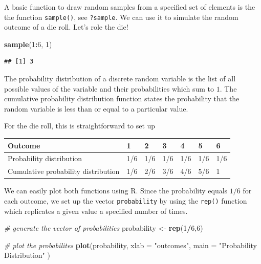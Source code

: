 \documentclass[]{book}
\newenvironment{Shaded}{\begin{snugshade}}{\end{snugshade}}
\newcommand{\KeywordTok}[1]{\textcolor[rgb]{0.13,0.29,0.53}{\textbf{#1}}}
\newcommand{\DataTypeTok}[1]{\textcolor[rgb]{0.13,0.29,0.53}{#1}}
\newcommand{\DecValTok}[1]{\textcolor[rgb]{0.00,0.00,0.81}{#1}}
\newcommand{\StringTok}[1]{\textcolor[rgb]{0.31,0.60,0.02}{#1}}
\newcommand{\CommentTok}[1]{\textcolor[rgb]{0.56,0.35,0.01}{\textit{#1}}}
\newcommand{\OperatorTok}[1]{\textcolor[rgb]{0.81,0.36,0.00}{\textbf{#1}}}
\newcommand{\NormalTok}[1]{#1}
\theoremstyle{definition}
\theoremstyle{definition}
\theoremstyle{definition}
\theoremstyle{remark}
\begin{document}
A basic function to draw random samples from a specified set of elements
is the the function \texttt{sample()}, see \texttt{?sample}. We can use
it to simulate the random outcome of a die roll. Let's role the die!

\begin{Shaded}
\begin{Highlighting}[]
\KeywordTok{sample}\NormalTok{(}\DecValTok{1}\OperatorTok{:}\DecValTok{6}\NormalTok{, }\DecValTok{1}\NormalTok{) }
\end{Highlighting}
\end{Shaded}

\begin{verbatim}
## [1] 3
\end{verbatim}

The probability distribution of a discrete random variable is the list
of all possible values of the variable and their probabilities which sum
to \(1\). The cumulative probability distribution function states the
probability that the random variable is less than or equal to a
particular value.

For the die roll, this is straightforward to set up

\begin{longtable}[]{@{}lllllll@{}}
\toprule
Outcome & 1 & 2 & 3 & 4 & 5 & 6\tabularnewline
\midrule
\endhead
Probability distribution & 1/6 & 1/6 & 1/6 & 1/6 & 1/6 &
1/6\tabularnewline
Cumulative probability distribution & 1/6 & 2/6 & 3/6 & 4/6 & 5/6 &
1\tabularnewline
\bottomrule
\end{longtable}

We can easily plot both functions using R. Since the probability equals
\(1/6\) for each outcome, we set up the vector \texttt{probability} by
using the \texttt{rep()} function which replicates a given value a
specified number of times.

\begin{Shaded}
\begin{Highlighting}[]
\CommentTok{# generate the vector of probabilities }
\NormalTok{probability <-}\StringTok{ }\KeywordTok{rep}\NormalTok{(}\DecValTok{1}\OperatorTok{/}\DecValTok{6}\NormalTok{,}\DecValTok{6}\NormalTok{) }

\CommentTok{# plot the probabilites }
\KeywordTok{plot}\NormalTok{(probability, }\DataTypeTok{xlab =} \StringTok{"outcomes"}\NormalTok{, }
     \DataTypeTok{main =} \StringTok{"Probability Distribution"}
\NormalTok{     ) }
\end{Highlighting}
\end{Shaded}
\end{document}
